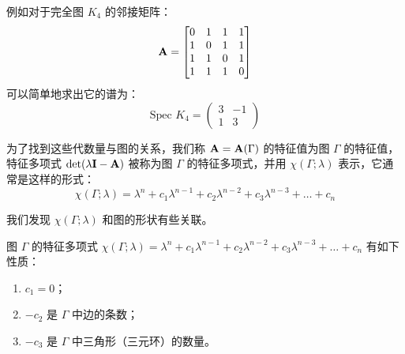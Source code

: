 例如对于完全图 $K_4$ 的邻接矩阵：
\[
\textbf A = 
\begin{bmatrix}
 0 & 1 & 1 & 1\\
 1 & 0 & 1 & 1\\
 1 & 1 & 0 & 1\\
 1 & 1 & 1 & 0
\end{bmatrix}
\]
可以简单地求出它的谱为：
\[
\text{Spec } K_4=\begin{pmatrix}
 3 & -1 \\
 1 & 3
\end{pmatrix}
\]

为了找到这些代数量与图的关系，我们称 $\textbf A = \textbf A(\Gamma)$ 的特征值为图 $\Gamma$ 的特征值，特征多项式 $\det(\lambda \textbf I - \textbf A)$ 被称为图 $\Gamma$ 的特征多项式，并用 $\chi(\Gamma; \lambda)$ 表示，它通常是这样的形式：
\[
\chi(\Gamma ; \lambda)=\lambda^{n}+c_{1} \lambda^{n-1}+c_{2} \lambda^{n-2}+c_{3} \lambda^{n-3}+\ldots+c_{n}
\]

我们发现 $\chi(\Gamma; \lambda)$ 和图的形状有些关联。

\begin{proposition}[图的特征多项式的系数]
图 $\Gamma$ 的特征多项式 $\chi(\Gamma ; \lambda)=\lambda^{n}+c_{1} \lambda^{n-1}+c_{2} \lambda^{n-2}+c_{3} \lambda^{n-3}+\ldots+c_{n}$ 有如下性质：
\begin{enumerate} 
\item $c_1 = 0$；
\item $-c_2$ 是 $\Gamma$ 中边的条数；
\item $-c_3$ 是 $\Gamma$ 中三角形（三元环）的数量。
\end{enumerate} 
\end{proposition}


